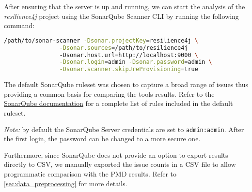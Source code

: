 \noindent After ensuring that the server is up and running, we can start the analysis of the \textit{resilience4j} project using the SonarQube Scanner CLI by running the following command:

\begin{lstlisting}[language=bash, caption={Command to run SonarQube analysis on \textit{resilience4j} project codebase}]
              /path/to/sonar-scanner -Dsonar.projectKey=resilience4j \
                -Dsonar.sources=/path/to/resilience4j 
                -Dsonar.host.url=http://localhost:9000 \
                -Dsonar.login=admin -Dsonar.password=admin \
                -Dsonar.scanner.skipJreProvisioning=true
\end{lstlisting}

The default SonarQube ruleset was chosen to capture a broad range of issues thus providing a common basis for comparing the tools results. Refer to the \href{https://docs.sonarqube.org/latest/analysis/languages/java/}{SonarQube documentation} for a complete list of rules included in the default ruleset.

\noindent \textit{Note:} by default the SonarQube Server credentials are set to \texttt{admin:admin}. After the first login, the password can be changed to a more secure one.

Furthermore, since SonarQube does not provide an option to export results directly to CSV, we manually exported the issue counts in a CSV file to allow programmatic comparison with the PMD results. Refer to \autoref{sec:data_preprocessing} for more details.
